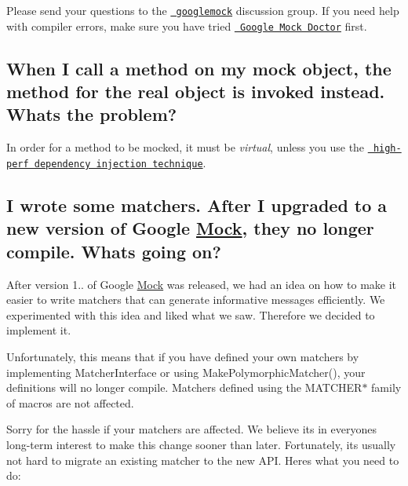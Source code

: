 Please send your questions to the \href{http://groups.google.com/group/googlemock}{\texttt{ googlemock}} discussion group. If you need help with compiler errors, make sure you have tried \href{\#how-am-i-supposed-to-make-sense-of-these-horrible-template-errors}{\texttt{ Google Mock Doctor}} first.

\subsection*{When I call a method on my mock object, the method for the real object is invoked instead. What\textquotesingle{}s the problem?}

In order for a method to be mocked, it must be {\itshape virtual}, unless you use the \href{CookBook.md\#mocking-nonvirtual-methods}{\texttt{ high-\/perf dependency injection technique}}.

\subsection*{I wrote some matchers. After I upgraded to a new version of Google \mbox{\hyperlink{class_mock}{Mock}}, they no longer compile. What\textquotesingle{}s going on?}

After version 1.. of Google \mbox{\hyperlink{class_mock}{Mock}} was released, we had an idea on how to make it easier to write matchers that can generate informative messages efficiently. We experimented with this idea and liked what we saw. Therefore we decided to implement it.

Unfortunately, this means that if you have defined your own matchers by implementing {\ttfamily Matcher\+Interface} or using {\ttfamily Make\+Polymorphic\+Matcher()}, your definitions will no longer compile. Matchers defined using the {\ttfamily M\+A\+T\+C\+H\+E\+R$\ast$} family of macros are not affected.

Sorry for the hassle if your matchers are affected. We believe it\textquotesingle{}s in everyone\textquotesingle{}s long-\/term interest to make this change sooner than later. Fortunately, it\textquotesingle{}s usually not hard to migrate an existing matcher to the new A\+PI. Here\textquotesingle{}s what you need to do\+:

